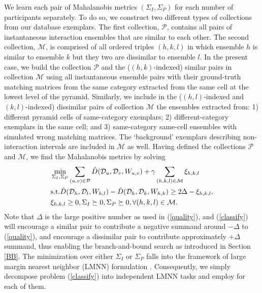\documentclass[10pt,twocolumn,letterpaper]{article}
\begin{document}
We learn each pair of Mahalanobis metrics $(\Sigma_{I}, \Sigma_{P})$ for each number of participants separately. To do so, we construct two different types of collections from our database exemplars. The first collection, $\mathcal{P}$, contains all pairs of instantaneous interaction ensembles that are similar to each other. The second collection, $\mathcal{M}$, is comprised of all ordered triples $(h,k,l)$ in which ensemble $h$ is similar to ensemble $k$ but they two  are dissimilar to ensemble $l$. In the present case, we build the collection $\mathcal{P}$ and the ($(h,k)$-indexed) similar pairs in collection $\mathcal{M}$ using all instantaneous ensemble pairs with their ground-truth matching matrices from the same category extracted from the same cell at the lowest level of the pyramid. Similarly, we include in the ($(h,l)$-indexed and $(k,l)$-indexed) dissimilar pairs  of collection $\mathcal{M}$ the ensembles extracted from: 1) different pyramid cells of same-category exemplars; 2) different-category exemplars in the same cell; and 3) same-category same-cell ensembles with simulated wrong matching matrices. The `background' exemplars describing non-interaction intervals are included in $\mathcal{M}$ as well. Having defined the collections $\mathcal{P}$ and $\mathcal{M}$, we find the Mahalanobis metrics by solving
\begin{equation}
\label{classify}
\begin{split}
&\min_{\Sigma_{I},\Sigma_{P}} \sum_{(u,v)\in\mathcal{P}}\hat{D}(\mathcal{D}_{u}, \mathcal{D}_{v}, W_{u,v})+\gamma\sum_{(h,k,l)\in\mathcal{M}}\xi_{h,k,l}\\
&\textup{s.t.}  \hat{D}(\mathcal{D}_{h}, \mathcal{D}_{l}, W_{h,l})-\hat{D}(\mathcal{D}_{h}, \mathcal{D}_{k}, W_{h,k})\ge 2\Delta-\xi_{h,k,l}, \\
&\xi_{h,k,l}\ge0, \Sigma_{I}\succeq 0, \Sigma_{P}\succeq 0, \forall (h,k,l)\in\mathcal{M}.
\end{split}
\end{equation}
Note that $\Delta$ is the large positive number as used in (\ref{quality}), and (\ref{classify}) will encourage a similar pair to contribute a negative summand around $-\Delta$ to (\ref{quality}), and encourage a dissimilar pair to contribute approximately $+\Delta$ summand,  thus enabling the branch-and-bound search as introduced in Section \ref{BB}.  The minimization over either $\Sigma_{I}$ or $\Sigma_{P}$ falls into the framework of large margin nearest neighbor (LMNN) formulation \cite{Weinberger:ML}. Consequently, we simply decompose problem (\ref{classify}) into independent LMNN tasks and employ \cite{Weinberger:ML} for each of them.
\end{document}
